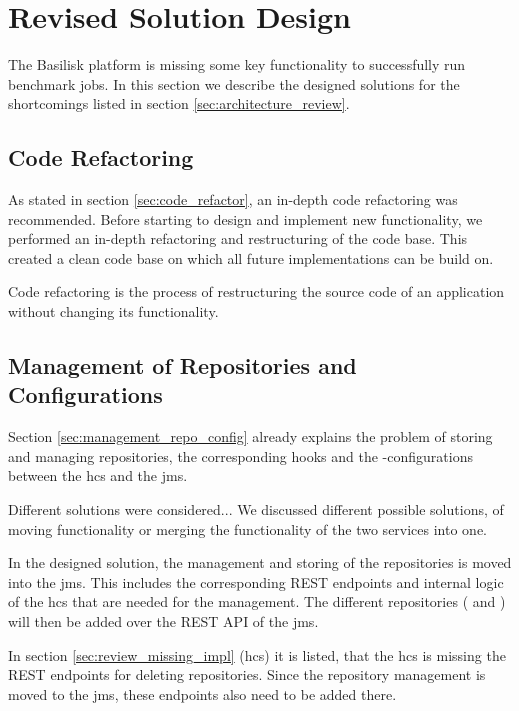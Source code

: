 \section{Revised Solution Design}
\label{sec:revised_solution_design}

The Basilisk platform is missing some key functionality to successfully run benchmark jobs.
In this section we describe the designed solutions for the shortcomings listed in section \ref{sec:architecture_review}.



\subsection{Code Refactoring}
\label{sec:impl_code_refactor}
As stated in section \ref{sec:code_refactor}, an in-depth code refactoring was recommended.
Before starting to design and implement new functionality, we performed an in-depth refactoring and restructuring of the code base.
This created a clean code base on which all future implementations can be build on.

Code refactoring is the process of restructuring the source code of an application without changing its functionality\cite{fowlerRefactoringImprovingDesign2019a}.


\subsection{Management of Repositories and Configurations}
\label{sec:management_repo_config_design}
Section \ref{sec:management_repo_config} already explains the problem of storing and managing repositories, the corresponding hooks and the \ts{}-configurations between the \acf{hcs} and the \acf{jms}.

Different solutions were considered...
We discussed different possible solutions, of moving functionality or merging the functionality of the two services into one.

In the designed solution, the management and storing of the repositories is moved into the \ac{jms}.
This includes the corresponding REST endpoints and internal logic of the \ac{hcs} that are needed for the management.
The different repositories (\gh{} and \dockh{}) will then be added over the REST API of the \ac{jms}.

In section \ref{sec:review_missing_impl} (\acl{hcs}) it is listed, that the \ac{hcs} is missing the REST endpoints for deleting repositories.
Since the repository management is moved to the \ac{jms}, these endpoints also need to be added there.
\\

